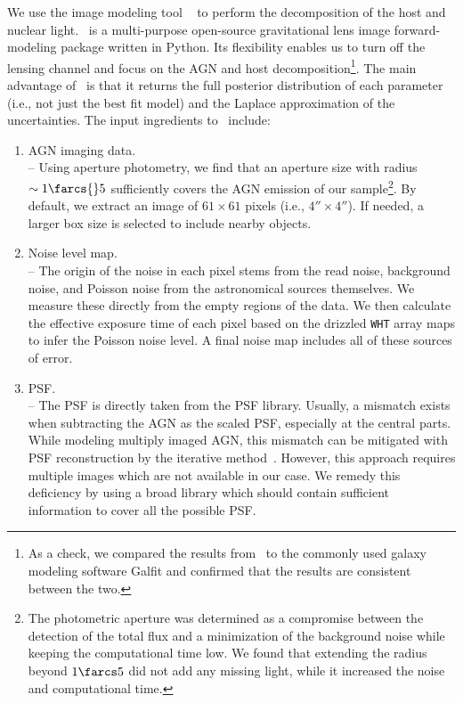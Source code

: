 \documentclass[apj]{emulateapj}
\begin{document}
We use the image modeling tool \lenstronomy~\citep{Birrer2015, lenstronomy} to perform the decomposition of the host and nuclear light. \lenstronomy\ is a multi-purpose open-source gravitational lens image forward-modeling package written in Python. 
Its flexibility enables us to turn off the lensing channel and focus on the AGN and host decomposition\footnote{As a check, we compared the results from \lenstronomy\ to the commonly used galaxy modeling software {\sc Galfit} and confirmed that the results are consistent between the two.}. The main advantage of \lenstronomy\ is that it returns the full posterior distribution of each parameter (i.e., not just the best fit model) and the Laplace approximation of the uncertainties. The input ingredients to \lenstronomy\ include:
\begin{enumerate}
\item AGN imaging data. \\
-- Using aperture photometry, we find that an aperture size with radius $\sim1\farcs{}5$ sufficiently covers the AGN emission of our sample\footnote{The photometric aperture was determined as a compromise between the detection of the total flux and a minimization of the background noise while keeping the computational time low. We found that extending the radius beyond $1\farcs5$ did not add any missing light, while it increased the noise and computational time. %
}. By default, we extract an image of $61\times61$ pixels (i.e., $4''\times 4''$). If needed, a larger box size is selected to include nearby objects. 
\item Noise level map.\\
-- The origin of the noise in each pixel stems from the read noise, background noise, and Poisson noise from the astronomical sources themselves. We measure these directly from the empty regions of the data. We then calculate the effective exposure time of each pixel based on the drizzled \texttt{WHT} array maps to infer the Poisson noise level. A final noise map includes all of these sources of error. 
  
\item PSF. \\
-- The PSF is directly taken from the PSF library. Usually, a mismatch exists when subtracting the AGN as the scaled PSF, especially at the central parts. While modeling multiply imaged AGN, this mismatch can be mitigated with PSF reconstruction by the iterative method~\citep{Chen2016, Birrer2018}.  However, this approach requires multiple images which are not available in our case.  We remedy this deficiency by using a broad library which should contain sufficient information to cover all the possible PSF. 
\end{enumerate}
\end{document}
